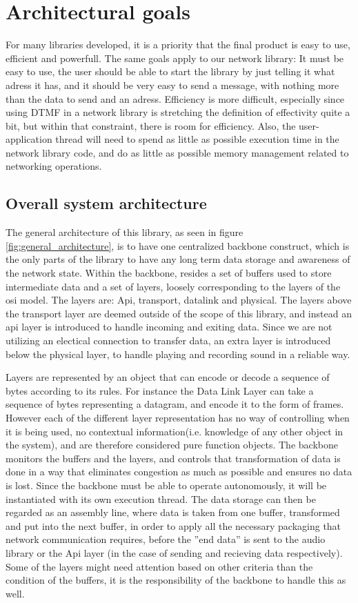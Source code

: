 \section{Architectural goals}
For many libraries developed, it is a priority that the final product is easy to use, efficient and powerfull.  The same goals apply to our network library: It must be easy to use, the user should be able to start the library by just telling it what adress it has, and it should be very easy to send a message, with nothing more than the data to send and an adress. Efficiency is more difficult, especially since using DTMF in a network library is stretching the definition of effectivity quite a bit, but within that constraint, there is room for efficiency.
Also, the user-application thread will need to spend as little as possible execution time in the network library code, and do as little as possible memory management related to networking operations. 



\subsection{Overall system architecture}
The general architecture of this library, as seen in figure \ref{fig:general_architecture}, is to have one centralized backbone construct, which is the only parts of the library to have any long term data storage and awareness of the network state. 
Within the backbone, resides a set of buffers used to store intermediate data and a set of layers, loosely corresponding to the layers of the osi model.
The layers are: Api, transport, datalink and physical.
The layers above the transport layer are deemed outside of the scope of this library, and instead an api layer is introduced to handle incoming and exiting data. Since we are not utilizing an electical connection to transfer data, an extra layer is introduced below the physical layer, to handle playing and recording sound in a reliable way.

Layers are represented by an object that can encode or decode a sequence of bytes according to its rules. For instance the Data Link Layer can take a sequence of bytes representing a datagram, and encode it to the form of frames.
However each of the different layer representation has no way of controlling when it is being used, no contextual information(i.e. knowledge of any other object in the system), and are therefore considered pure function objects.
The backbone monitors the buffers and the layers, and controls that transformation of data is done in a way that eliminates congestion as much as possible and ensures no data is lost. Since the backbone must be able to operate autonomously, it will be instantiated with its own execution thread. The data storage can then be regarded as an assembly line, where data is taken from one buffer, transformed and put into the next buffer, in order to apply all the necessary packaging that network communication requires, before the ''end data'' is sent to the audio library or the Api layer (in the case of sending and recieving data respectively).
Some of the layers might need attention based on other criteria than the condition of the buffers, it is the responsibility of the backbone to handle this as well.

